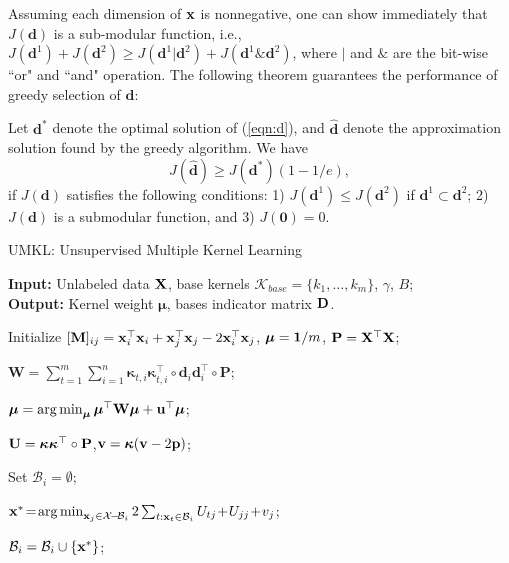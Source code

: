 Assuming each dimension of $\mathbf{x}$ is nonnegative, one can show immediately that $J(\mathbf d)$ is a sub-modular function, i.e., $J(\mathbf d^1) + J(\mathbf d^2) \geq J(\mathbf d^1 | \mathbf d^2) + J(\mathbf d^1 \& \mathbf d^2)$, where $|$ and $\&$ are the bit-wise ``or" and ``and" operation. The following theorem guarantees the performance of greedy selection of $\mathbf d$:
\begin{theorem}
Let $\mathbf d^*$ denote the optimal solution of (\ref{eqn:d}), and $\hat{\mathbf d}$ denote the approximation solution found by the greedy algorithm. We have
\[
J(\hat{\mathbf d}) \geq J(\mathbf d^*)(1 - 1/ e),
\]
if $J(\mathbf d)$ satisfies the following conditions: 1) $J(\mathbf d^1)\leq J(\mathbf d^2)$ if $\mathbf d^1\subset \mathbf d^2$; 2) $J(\mathbf d)$ is a submodular function, and 3) $J(\mathbf 0)=0$.
\end{theorem}

\begin{algorithm}[!htp]\label{alg:umkl}
\caption{UMKL: Unsupervised Multiple Kernel Learning}
\textbf{Input:} Unlabeled data ${\mathbf X}$, base kernels $\mathcal K_{base} = \{k_1,\ldots,k_m\}$, $\gamma$, $B$; \\
\textbf{Output:} Kernel weight $\bm\mu$, bases indicator matrix ${\mathbf D}$.\\\vspace{-0.1in}
\begin{algorithmic}
[1]\STATE Initialize $[{\bf M}]_{ij} = \mathbf{x}_i^\top\mathbf{x}_i + \mathbf{x}_j^\top\mathbf{x}_j - 2\mathbf{x}_i^\top\mathbf{x}_j$, $\boldsymbol{\mu}=\mathbf{1}/m$, $\mathbf P={\mathbf X}^\top{\mathbf X}$;

\REPEAT

\STATE $\mathbf W = \sum_{t=1}^m \sum_{i=1}^n\bm\kappa_{t,i}\bm\kappa_{t,i}^\top\circ\mathbf d_i\mathbf d_i^\top\circ\mathbf P$;

\STATE $\bm\mu = \argmin_{\bm\mu}\bm\mu^\top\mathbf W\bm\mu + \mathbf u^\top\bm\mu$;




\STATE ${\bf U} = \boldsymbol{\kappa}\boldsymbol{\kappa}^\top\circ\mathbf P$,${\bf v} = \boldsymbol{\kappa}(\mathbf v - 2\mathbf p)$;

\STATE Set $\mathcal B_i = \emptyset$;


\STATE $\x^* \!=\! \argmin_{\x_j\in\mathcal X\!-\!\mathcal B_i}2\sum_{t:\x_t\in\mathcal B_i}U_{tj}\!+\!U_{jj} \!+\! v_j$;

\STATE $\mathcal B_i=\mathcal B_i\cup\{\mathbf{x}^*\}$;

\ENDFOR

\ENDFOR


\end{algorithmic}
\end{algorithm}

